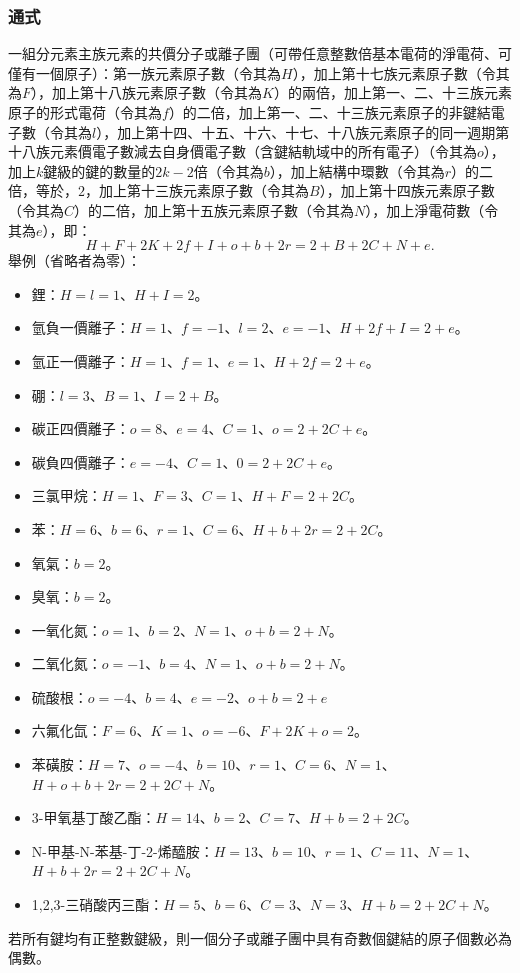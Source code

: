 \documentclass[a4paper,12pt]{report}
\begin{document}
\subsubsection{通式}
一組分元素主族元素的共價分子或離子團（可帶任意整數倍基本電荷的淨電荷、可僅有一個原子）：第一族元素原子數（令其為$H$），加上第十七族元素原子數（令其為$F$），加上第十八族元素原子數（令其為$K$）的兩倍，加上第一、二、十三族元素原子的形式電荷（令其為$f$）的二倍，加上第一、二、十三族元素原子的非鍵結電子數（令其為$l$），加上第十四、十五、十六、十七、十八族元素原子的同一週期第十八族元素價電子數減去自身價電子數（含鍵結軌域中的所有電子）（令其為$o$），加上$k$鍵級的鍵的數量的$2k-2$倍（令其為$b$），加上結構中環數（令其為$r$）的二倍，等於，$2$，加上第十三族元素原子數（令其為$B$），加上第十四族元素原子數（令其為$C$）的二倍，加上第十五族元素原子數（令其為$N$），加上淨電荷數（令其為$e$），即：
\[H+F+2K+2f+I+o+b+2r=2+B+2C+N+e.\]
舉例（省略者為零）：
\begin{itemize}
\item 鋰：$H=l=1$、$H+I=2$。
\item 氫負一價離子：$H=1$、$f=-1$、$l=2$、$e=-1$、$H+2f+I=2+e$。
\item 氫正一價離子：$H=1$、$f=1$、$e=1$、$H+2f=2+e$。
\item 硼：$l=3$、$B=1$、$I=2+B$。
\item 碳正四價離子：$o=8$、$e=4$、$C=1$、$o=2+2C+e$。
\item 碳負四價離子：$e=-4$、$C=1$、$0=2+2C+e$。
\item 三氯甲烷：$H=1$、$F=3$、$C=1$、$H+F=2+2C$。
\item 苯：$H=6$、$b=6$、$r=1$、$C=6$、$H+b+2r=2+2C$。
\item 氧氣：$b=2$。
\item 臭氧：$b=2$。
\item 一氧化氮：$o=1$、$b=2$、$N=1$、$o+b=2+N$。
\item 二氧化氮：$o=-1$、$b=4$、$N=1$、$o+b=2+N$。
\item 硫酸根：$o=-4$、$b=4$、$e=-2$、$o+b=2+e$
\item 六氟化氙：$F=6$、$K=1$、$o=-6$、$F+2K+o=2$。
\item 苯磺胺：$H=7$、$o=-4$、$b=10$、$r=1$、$C=6$、$N=1$、$H+o+b+2r=2+2C+N$。
\item 3-甲氧基丁酸乙酯：$H=14$、$b=2$、$C=7$、$H+b=2+2C$。
\item N-甲基-N-苯基-丁-2-烯醯胺：$H=13$、$b=10$、$r=1$、$C=11$、$N=1$、$H+b+2r=2+2C+N$。
\item 1,2,3-三硝酸丙三酯：$H=5$、$b=6$、$C=3$、$N=3$、$H+b=2+2C+N$。
\end{itemize}
若所有鍵均有正整數鍵級，則一個分子或離子團中具有奇數個鍵結的原子個數必為偶數。
\end{document}
